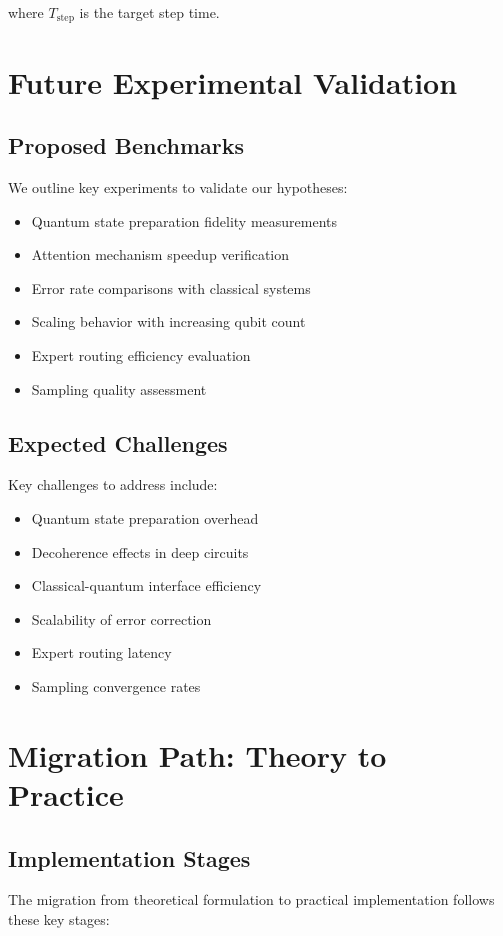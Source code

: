 \documentclass{article}
\begin{document}
where $T_{\text{step}}$ is the target step time.

\section{Future Experimental Validation}

\subsection{Proposed Benchmarks}
We outline key experiments to validate our hypotheses:

\begin{itemize}
\item Quantum state preparation fidelity measurements
\item Attention mechanism speedup verification
\item Error rate comparisons with classical systems
\item Scaling behavior with increasing qubit count
\item Expert routing efficiency evaluation
\item Sampling quality assessment
\end{itemize}

\subsection{Expected Challenges}
Key challenges to address include:

\begin{itemize}
\item Quantum state preparation overhead
\item Decoherence effects in deep circuits
\item Classical-quantum interface efficiency
\item Scalability of error correction
\item Expert routing latency
\item Sampling convergence rates
\end{itemize}

\section{Migration Path: Theory to Practice}

\subsection{Implementation Stages}
The migration from theoretical formulation to practical implementation follows these key stages:
\end{document}
